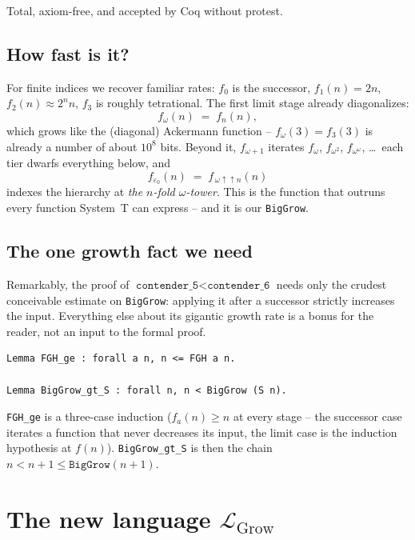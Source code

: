 \documentclass[11pt,a4paper]{article}
\theoremstyle{plain}
\theoremstyle{definition}
\theoremstyle{remark}
\begin{document}
Total, axiom-free, and accepted by Coq without protest.

\subsection{How fast is it?}

For finite indices we recover familiar rates: $f_0$ is the successor,
$f_1(n) = 2n$, $f_2(n) \approx 2^n n$, $f_3$ is roughly tetrational.
The first limit stage already diagonalizes:
\[
  f_\omega(n) \;=\; f_n(n),
\]
which grows like the (diagonal) Ackermann function --
$f_\omega(3) = f_3(3)$ is already a number of about $10^8$ bits.
Beyond it, $f_{\omega+1}$ iterates $f_\omega$, $f_{\omega^2}$,
$f_{\omega^\omega}$, \dots\ each tier dwarfs everything below, and
\[
  f_{\varepsilon_0}(n) \;=\; f_{\,\omega\uparrow\uparrow n}(n)
\]
indexes the hierarchy at \emph{the $n$-fold $\omega$-tower}.  This is
the function that outruns every function System~T can express -- and
it is our \texttt{BigGrow}.

\subsection{The one growth fact we need}

Remarkably, the proof of
$\texttt{contender\_5} < \texttt{contender\_6}$ needs only the
crudest conceivable estimate on \texttt{BigGrow}: applying it after a
successor strictly increases the input.  Everything else about its
gigantic growth rate is a bonus for the reader, not an input to the
formal proof.

\begin{lstlisting}
Lemma FGH_ge : forall a n, n <= FGH a n.

Lemma BigGrow_gt_S : forall n, n < BigGrow (S n).
\end{lstlisting}

\texttt{FGH\_ge} is a three-case induction ($f_a(n) \geq n$ at every
stage -- the successor case iterates a function that never decreases
its input, the limit case is the induction hypothesis at $f(n)$).
\texttt{BigGrow\_gt\_S} is then the chain
$n < n+1 \leq \texttt{BigGrow}(n+1)$.

\section{The new language $\mathcal{L}_{\textrm{Grow}}$}
\label{sec:lgrow}
\end{document}

